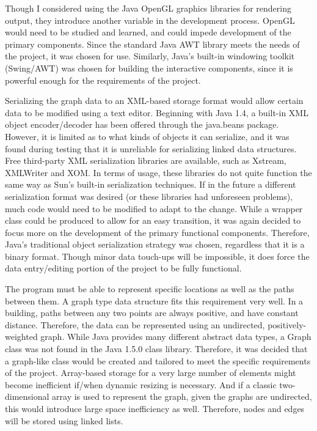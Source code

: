 \documentclass[12pt,letterpaper,titlepage]{article}   %
\begin{document}
Though I considered using the Java OpenGL graphics libraries for
rendering output, they introduce another variable in the development
process. OpenGL would need to be studied and learned, and could impede
development of the primary components. Since the standard Java AWT
library meets the needs of the project, it was chosen for use.
Similarly, Java's built-in windowing toolkit (Swing/AWT) was chosen for
building the interactive components, since it is powerful enough for the
requirements of the project.

Serializing the graph data to an XML-based storage format would allow
certain data to be modified using a text editor. Beginning with Java
1.4, a built-in XML object encoder/decoder has been offered through the
java.beans package. However, it is limited as to what kinds of objects
it can serialize, and it was found during testing that it is unreliable
for serializing linked data structures. Free third-party XML
serialization libraries are available, such as Xstream, XMLWriter and
XOM. In terms of usage, these libraries do not quite function the same
way as Sun's built-in serialization techniques. If in the future a
different serialization format was desired (or these libraries had
unforeseen problems), much code would need to be modified to adapt to
the change. While a wrapper class could be produced to allow for an easy
transition, it was again decided to focus more on the development of the
primary functional components. Therefore, Java's traditional object
serialization strategy was chosen, regardless that it is a binary
format. Though minor data touch-ups will be impossible, it does force
the data entry/editing portion of the project to be fully functional.

The program must be able to represent specific locations as well as the
paths between them. A graph type data structure fits this requirement
very well. In a building, paths between any two points are always
positive, and have constant distance. Therefore, the data can be
represented using an undirected, positively-weighted graph. While Java
provides many different abstract data types, a Graph class was not found
in the Java 1.5.0 class library. Therefore, it was decided that a
graph-like class would be created and tailored to meet the specific
requirements of the project. Array-based storage for a very large number
of elements might become inefficient if/when dynamic resizing is
necessary. And if a classic two-dimensional array is used to represent
the graph, given the graphs are undirected, this would introduce large
space inefficiency as well. Therefore, nodes and edges will be stored
using linked lists. 
\end{document}

